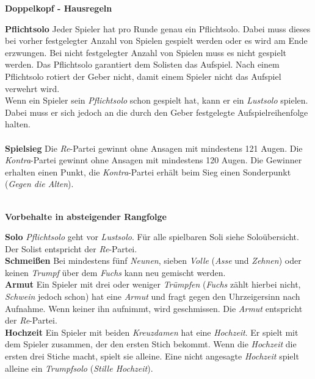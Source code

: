 \documentclass[11pt,a4paper,landscape]{article}
\begin{document}
\begin{center}
\textbf{Doppelkopf - Hausregeln}
\end{center}

\begin{multicols}{3}

\textbf{Pflichtsolo} Jeder Spieler hat pro Runde genau ein Pflichtsolo. Dabei muss dieses bei vorher festgelegter Anzahl von Spielen gespielt werden oder es wird am Ende erzwungen. Bei nicht festgelegter Anzahl von Spielen muss es nicht gespielt werden. Das Pflichtsolo garantiert dem Solisten das Aufspiel. Nach einem Pflichtsolo rotiert der Geber nicht, damit einem Spieler nicht das Aufspiel verwehrt wird.  \\
Wenn ein Spieler sein \textit{Pflichtsolo} schon gespielt hat, kann er ein \textit{Lustsolo} spielen. Dabei muss er sich jedoch an die durch den Geber festgelegte Aufspielreihenfolge halten.\\
\vspace*{-0.3cm}\\
\textbf{Spielsieg} Die \textit{Re}-Partei gewinnt ohne Ansagen mit mindestens 121 Augen. Die \textit{Kontra}-Partei gewinnt ohne Ansagen mit mindestens 120 Augen. Die Gewinner erhalten einen Punkt, die \textit{Kontra}-Partei erhält beim Sieg einen Sonderpunkt (\textit{Gegen die Alten}). \\
\vspace*{-1cm}\\
\begin{center}
\textbf{Vorbehalte in absteigender Rangfolge}
\end{center}
\textbf{Solo} \textit{Pflichtsolo} geht vor \textit{Lustsolo}. Für alle spielbaren Soli siehe Soloübersicht. Der Solist entspricht der \textit{Re}-Partei. \\
\textbf{Schmeißen} Bei mindestens fünf \textit{Neunen}, sieben \textit{Volle} (\textit{Asse} und \textit{Zehnen}) oder keinen \textit{Trumpf} über dem \textit{Fuchs} kann neu gemischt werden. \\
\textbf{Armut} Ein Spieler mit drei oder weniger \textit{Trümpfen} (\textit{Fuchs} zählt hierbei nicht, \textit{Schwein} jedoch schon) hat eine \textit{Armut} und fragt gegen den Uhrzeigersinn nach Aufnahme. Wenn keiner ihn aufnimmt, wird geschmissen. Die \textit{Armut} entspricht der \textit{Re}-Partei. \\
\textbf{Hochzeit} Ein Spieler mit beiden \textit{Kreuzdamen} hat eine \textit{Hochzeit}. Er spielt mit dem Spieler zusammen, der den ersten Stich bekommt. Wenn die \textit{Hochzeit} die ersten drei Stiche macht, spielt sie alleine. Eine nicht angesagte \textit{Hochzeit} spielt alleine ein \textit{Trumpfsolo} (\textit{Stille Hochzeit}). 
\columnbreak


\end{multicols}
\end{document}
